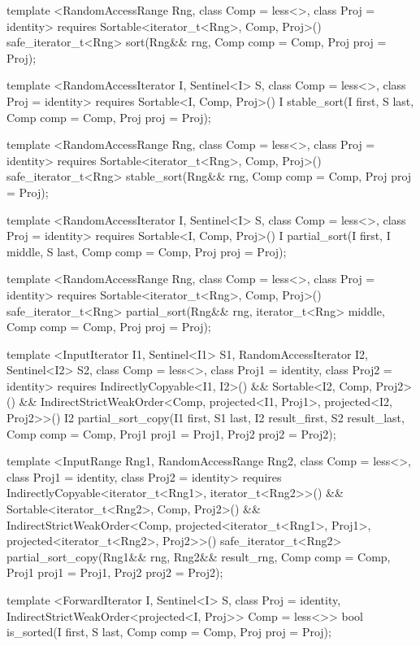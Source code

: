 \begin{codeblock}
{{{{  template <RandomAccessRange Rng, class Comp = less<>, class Proj = identity>
    requires Sortable<iterator_t<Rng>, Comp, Proj>()
    safe_iterator_t<Rng>
      sort(Rng&& rng, Comp comp = Comp{}, Proj proj = Proj{});

  template <RandomAccessIterator I, Sentinel<I> S, class Comp = less<>,
      class Proj = identity>
    requires Sortable<I, Comp, Proj>()
    I stable_sort(I first, S last, Comp comp = Comp{}, Proj proj = Proj{});

  template <RandomAccessRange Rng, class Comp = less<>, class Proj = identity>
    requires Sortable<iterator_t<Rng>, Comp, Proj>()
    safe_iterator_t<Rng>
      stable_sort(Rng&& rng, Comp comp = Comp{}, Proj proj = Proj{});

  template <RandomAccessIterator I, Sentinel<I> S, class Comp = less<>,
      class Proj = identity>
    requires Sortable<I, Comp, Proj>()
    I partial_sort(I first, I middle, S last, Comp comp = Comp{}, Proj proj = Proj{});

  template <RandomAccessRange Rng, class Comp = less<>, class Proj = identity>
    requires Sortable<iterator_t<Rng>, Comp, Proj>()
    safe_iterator_t<Rng>
      partial_sort(Rng&& rng, iterator_t<Rng> middle, Comp comp = Comp{},
                   Proj proj = Proj{});

  template <InputIterator I1, Sentinel<I1> S1, RandomAccessIterator I2, Sentinel<I2> S2,
      class Comp = less<>, class Proj1 = identity, class Proj2 = identity>
    requires IndirectlyCopyable<I1, I2>() && Sortable<I2, Comp, Proj2>() &&
        IndirectStrictWeakOrder<Comp, projected<I1, Proj1>, projected<I2, Proj2>>()
    I2
      partial_sort_copy(I1 first, S1 last, I2 result_first, S2 result_last,
                        Comp comp = Comp{}, Proj1 proj1 = Proj1{}, Proj2 proj2 = Proj2{});

  template <InputRange Rng1, RandomAccessRange Rng2, class Comp = less<>,
      class Proj1 = identity, class Proj2 = identity>
    requires IndirectlyCopyable<iterator_t<Rng1>, iterator_t<Rng2>>() &&
        Sortable<iterator_t<Rng2>, Comp, Proj2>() &&
        IndirectStrictWeakOrder<Comp, projected<iterator_t<Rng1>, Proj1>,
          projected<iterator_t<Rng2>, Proj2>>()
    safe_iterator_t<Rng2>
      partial_sort_copy(Rng1&& rng, Rng2&& result_rng, Comp comp = Comp{},
                        Proj1 proj1 = Proj1{}, Proj2 proj2 = Proj2{});

  template <ForwardIterator I, Sentinel<I> S, class Proj = identity,
      IndirectStrictWeakOrder<projected<I, Proj>> Comp = less<>>
    bool is_sorted(I first, S last, Comp comp = Comp{}, Proj proj = Proj{});

}}}}
\end{codeblock}
